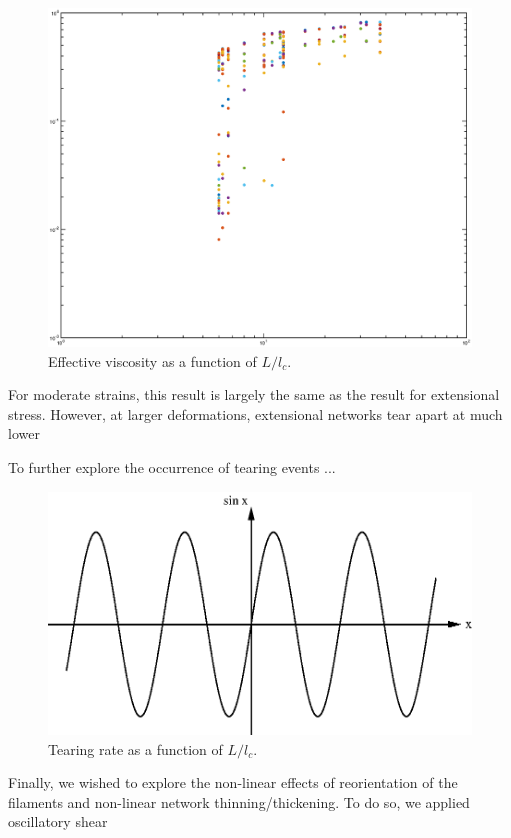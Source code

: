 \documentclass[prb,11pt]{revtex4-1}
\begin{document}
\begin{figure}[h!]
\centering
\includegraphics[width=\textwidth]{eff_vic}
\caption{\label{fig:effvic}Effective viscosity as a function of $L/l_c$.}
\end{figure}

For moderate strains, this result is largely the same as the result for extensional stress.  However, at larger deformations, extensional networks tear apart at much lower

To further explore the occurrence of tearing events ...

\begin{figure}[h!]
\centering
\includegraphics[scale=0.6]{sine}
\caption{\label{fig:tear}Tearing rate as a function of $L/l_c$.}
\end{figure}

Finally, we wished to explore the non-linear effects of reorientation of the filaments and non-linear network thinning/thickening.  To do so, we applied oscillatory shear 
\end{document}
